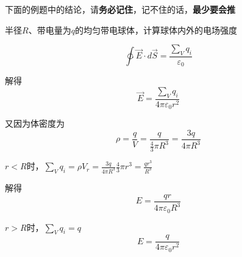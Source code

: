 \documentclass[lang=cn,10pt]{elegantbook}
\begin{document}
		下面的例题中的结论，请\textbf{务必记住}，记不住的话，\textbf{最少要会推}
		\begin{example}
			半径$R$、带电量为$q$的均匀带电球体，计算球体内外的电场强度
		\end{example}
		\begin{solution}
			\begin{equation*}
				\ointctrclockwise{\overrightarrow{E}\cdot d\overrightarrow{S}}=\frac{\sum_V{q_i}}{\varepsilon _0}
			\end{equation*}
			
			解得
			\begin{equation*}
				\overrightarrow{E}=\frac{\sum_V{q_i}}{4\pi \varepsilon _0r^2}
			\end{equation*}
			
			又因为体密度为
			\begin{equation*}
				\rho =\frac{q}{V}=\frac{q}{\frac{4}{3}\pi R^3}=\frac{3q}{4\pi R^3}
			\end{equation*}
			
			$r<R$时，$\sum_V{q_i}=\rho V_{r}=\frac{3q}{4\pi R^3}\frac{4}{3}\pi r^3=\frac{qr^{3}}{R^{3}}$
			
			解得
			\begin{equation*}
				E=\frac{qr}{4\pi\varepsilon_{0}R^{3}}
			\end{equation*}
			
			$r>R$时，$\sum_V{q_i}=q$
			\begin{equation*}
				E=\frac{q}{4\pi\varepsilon_{0}r^{2}}
			\end{equation*}
		\end{solution}
		
\end{document}
